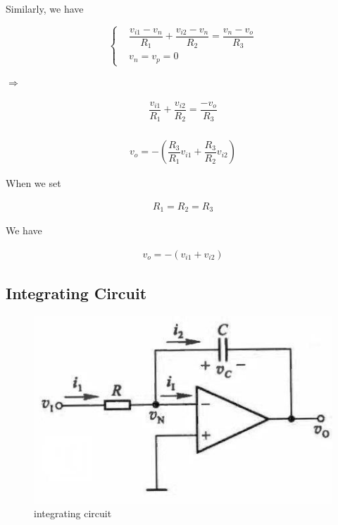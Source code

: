 Similarly, we have

\begin{equation*}
  \left\{
  \begin{aligned}
    & \dfrac{v_{i1} - v_n}{R_1} + \dfrac{v_{i2}- v_n}{R_2} = \dfrac{v_n - v_o}{R_3} \\
    & v_n= v_p = 0
  \end{aligned}
  \right.
\end{equation*}

$\Rightarrow$

\begin{equation*}
  \begin{aligned}
    \dfrac{v_{i1}}{R_1} + \dfrac{v_{i2}}{R_2} = \dfrac{- v_o}{R_3} \\
  \end{aligned}
\end{equation*}

\begin{equation*}
  \begin{aligned}
    v_o = - \left( \dfrac{R_3}{R_1} v_{i1} + \dfrac{R_3}{R_2} v_{i2} \right) 
  \end{aligned}
\end{equation*}

When we set

\begin{equation*}
  \begin{aligned}
    R_1 = R_2 = R_3
  \end{aligned}
\end{equation*}

We have

\begin{equation*}
  \begin{aligned}
    v_o = - \left( v_{i1} + v_{i2} \right)
  \end{aligned}
\end{equation*}

\subsection{Integrating Circuit}

\begin{figure}[H]
  \centering
  \includegraphics[width=0.6\linewidth]{figures/integrating-circuit}
  \caption{integrating circuit}
  \label{fig:}
\end{figure}

